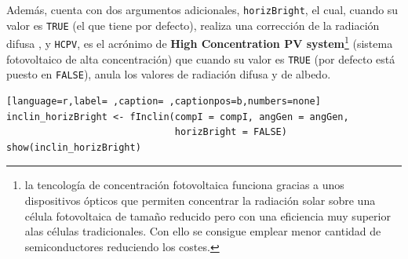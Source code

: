 \begin{itemize}
Además, cuenta con dos argumentos adicionales, \texttt{horizBright}, el cual, cuando su valor es \texttt{TRUE} (el que tiene por defecto), realiza una corrección de la radiación difusa \cite{REINDL19909}, y \texttt{HCPV}, es el acrónimo de \textbf{High Concentration PV system}\footnote{la tencología de concentración fotovoltaica funciona gracias a unos dispositivos ópticos que permiten concentrar la radiación solar sobre una célula fotovoltaica de tamaño reducido pero con una eficiencia muy superior alas células tradicionales. Con ello se consigue emplear menor cantidad de semiconductores reduciendo los costes.} (sistema fotovoltaico de alta concentración) que cuando su valor es \texttt{TRUE} (por defecto está puesto en \texttt{FALSE}), anula los valores de radiación difusa y de albedo.
\begin{lstlisting}[language=r,label= ,caption= ,captionpos=b,numbers=none]
inclin_horizBright <- fInclin(compI = compI, angGen = angGen,
                              horizBright = FALSE)
show(inclin_horizBright)
\end{lstlisting}


\end{itemize}
